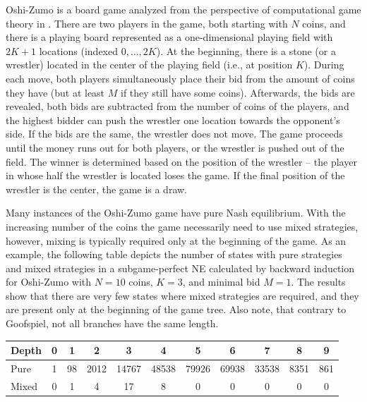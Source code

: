 Oshi-Zumo is a board game analyzed from the perspective of computational game theory in \cite{buro2003}.
There are two players in the game, both starting with $N$ coins, and there is a playing board represented as a one-dimensional playing field with $2K+1$ locations (indexed $0, \ldots, 2K$).
At the beginning, there is a stone (or a wrestler) located in the center of the playing field (i.e., at position $K$).
During each move, both players simultaneously place their bid from the amount of coins they have (but at least $M$ if they still have some coins).
Afterwards, the bids are revealed, both bids are subtracted from the number of coins of the players, and the highest bidder can push the wrestler one location towards the opponent's side.
If the bids are the same, the wrestler does not move.
The game proceeds until the money runs out for both players, or the wrestler is pushed out of the field.
The winner is determined based on the position of the wrestler -- the player in whose half the wrestler is located loses the game.
If the final position of the wrestler is the center, the game is a draw.

Many instances of the Oshi-Zumo game have pure Nash equilibrium.
With the increasing number of the coins the game necessarily need to use mixed strategies, however, mixing is typically required only at the beginning of the game.
As an example, the following table depicts the number of states with pure strategies and mixed strategies in a subgame-perfect NE calculated by backward induction for Oshi-Zumo with $N=10$ coins, $K=3$, and minimal bid $M=1$. The results show that there are very few states where mixed strategies are required, and they are present only at the beginning of the game tree. Also note, that contrary to Goofspiel, not all branches have the same length.

\vspace{0.1cm}

\begin{center}
\small
\begin{tabular}{|l|c|c|c|c|c|c|c|c|c|c|}
\hline Depth & 0 & 1 & 2 & 3 & 4 & 5 & 6 & 7 & 8 & 9\\
\hline Pure  & 1 & 98 & 2012 & 14767 & 48538 & 79926 & 69938 & 33538 & 8351 & 861\\
\hline Mixed & 0 &  1 &  4 &  17 & 8 & 0 & 0 & 0 & 0 & 0 \\
\hline
\end{tabular}
\end{center}

